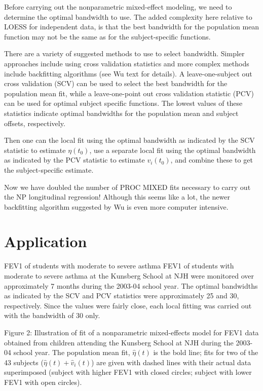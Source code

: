 \documentclass[
  9pt,
  ignorenonframetext,
]{beamer}
\begin{document}
\begin{frame}{}
\protect\hypertarget{section-7}{}
Before carrying out the nonparametric mixed-effect modeling, we need to
determine the optimal bandwidth to use. The added complexity here
relative to LOESS for independent data, is that the best bandwidth for
the population mean function may not be the same as for the
subject-specific functions.

There are a variety of suggested methods to use to select bandwidth.
Simpler approaches include using cross validation statistics and more
complex methods include backfitting algorithms (see Wu text for
details). A leave-one-subject out cross validation (SCV) can be used to
select the best bandwidth for the population mean fit, while a
leave-one-point out cross validation statistic (PCV) can be used for
optimal subject specific functions. The lowest values of these
statistics indicate optimal bandwidths for the population mean and
subject offsets, respectively.

Then one can the local fit using the optimal bandwidth as indicated by
the SCV statistic to estimate \(\eta (t_0)\), use a separate local fit
using the optimal bandwidth as indicated by the PCV statistic to
estimate \(v_i(t_0)\), and combine these to get the subject-specific
estimate.

Now we have doubled the number of PROC MIXED fits necessary to carry out
the NP longitudinal regression! Although this seems like a lot, the
newer backfitting algorithm suggested by Wu is even more computer
intensive.
\end{frame}

\hypertarget{application}{%
\section{Application}\label{application}}

\begin{frame}{FEV1 of students with moderate to severe asthma}
\protect\hypertarget{fev1-of-students-with-moderate-to-severe-asthma}{}
FEV1 of students with moderate to severe asthma at the Kunsberg School
at NJH were monitored over approximately 7 months during the 2003-04
school year. The optimal bandwidths as indicated by the SCV and PCV
statistics were approximately 25 and 30, respectively. Since the values
were fairly close, each local fitting was carried out with the bandwidth
of 30 only.

Figure 2: Illustration of fit of a nonparametric mixed-effects model for
FEV1 data obtained from children attending the Kunsberg School at NJH
during the 2003-04 school year. The population mean fit,
\(\hat \eta (t)\) is the bold line; fits for two of the 43 subjects
(\(\hat \eta (t)+\hat v_i(t)\)) are given with dashed lines with their
actual data superimposed (subject with higher FEV1 with closed circles;
subject with lower FEV1 with open circles).
\end{frame}
\end{document}
